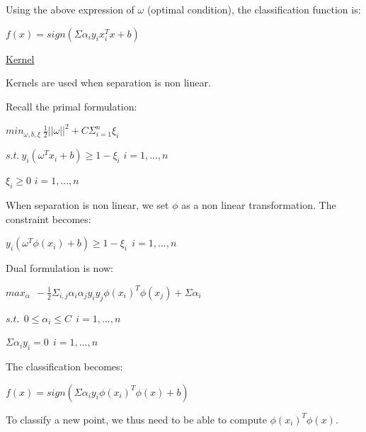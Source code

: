 \vspace{5mm}

Using the above expression of $\omega$ (optimal condition), the classification function is:

\begin{center}
$f(x)=sign(\Sigma \alpha_i y_i x_i^T x + b)$
\end{center}

\vspace{5mm}

\underline{Kernel}

\vspace{5mm}

Kernels are used when separation is non linear.

Recall the primal formulation:

\begin{center}
$min_{\omega,b, \xi}~\frac{1}{2}||\omega||^2+C\Sigma_{i=1}^{n}\xi_i$

$s.t.~y_i(\omega^Tx_i+b) \geq 1 - \xi_i$ $i=1,...,n$

$\xi_i \geq 0$ $i=1,...,n$
\end{center}

When separation is non linear, we set $\phi$ as a non linear transformation. The constraint becomes:

$y_i(\omega^T\phi(x_i)+b) \geq 1 - \xi_i~~i=1,...,n$

\vspace{5mm}

Dual formulation is now:

\begin{center}

$max_\alpha~~-\frac{1}{2}\Sigma_{i,j} \alpha_i \alpha_j y_i y_j \phi(x_i)^T \phi(x_j) + \Sigma \alpha_i$

$s.t.~~0 \leq \alpha_i \leq C~~i=1,...,n$

$\Sigma \alpha_i y_i = 0~~i=1,...,n$

\end{center}

\vspace{5mm}

The classification becomes:

\begin{center}
$f(x)=sign(\Sigma \alpha_i y_i \phi(x_i)^T \phi(x) + b)$
\end{center}

To classify a new point, we thus need to be able to compute $\phi(x_i)^T \phi(x)$.

\vspace{5mm}

